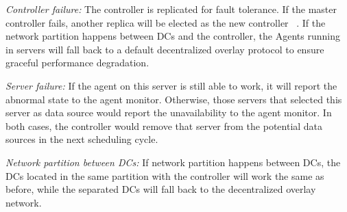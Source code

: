 \begin{packedenumerate}
\item \emph{Controller failure:} The controller is replicated for fault tolerance. If the master controller fails, another replica will be elected as the new controller ~\cite{lamport1998part}. If the network partition happens between DCs and the controller, the Agents running in servers will fall back to a default decentralized overlay protocol to ensure graceful performance degradation.
\item \emph{Server failure:} If the agent on this server is still able to work, it will report the abnormal state to the agent monitor. Otherwise, those servers that selected this server as data source would report the unavailability to the agent monitor. In both cases, the controller would remove that server from the potential data sources in the next scheduling cycle.
\item \emph{Network partition between DCs:} 
If network partition happens between DCs, the DCs located in the same partition with the controller will work the same as before, while the separated DCs will fall back to the decentralized overlay network.
\end{packedenumerate}
%
%
%
%
%



